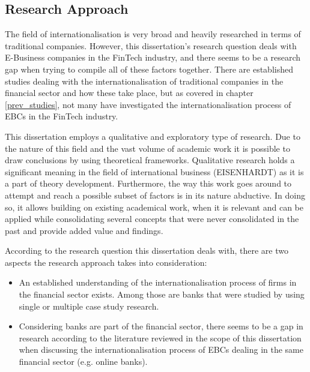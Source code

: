 \documentclass[11pt,a4paper]{article}
\begin{document}
{{\subsection{Research Approach} %
The field of internationalisation is very broad and heavily researched in terms of traditional companies. However, this dissertation's research question deals with E-Business companies in the FinTech industry, and there seems to be a research gap when trying to compile all of these factors together. There are established studies dealing with the internationalisation of traditional companies in the financial sector and how these take place, but as covered in chapter \ref{prev_studies}, not many have investigated the internationalisation process of EBCs in the FinTech industry. \par
This dissertation employs a qualitative and exploratory type of research. Due to the nature of this field and the vast volume of academic work it is possible to draw conclusions by using theoretical frameworks. Qualitative research holds a significant meaning in the field of international business (EISENHARDT) as it is a part of theory development. Furthermore, the way this work goes around to attempt and reach a possible subset of factors is in its nature abductive.  In doing so, it allows building on existing academical work, when it is relevant and can be applied while consolidating several concepts that were never consolidated in the past and provide added value and findings. \par %
According to the research question this dissertation deals with, there are two aspects the research approach takes into consideration:
\begin{itemize}
 \item {An established understanding of the internationalisation process of firms in the financial sector exists. Among those are banks that were studied by using single or multiple case study research.}
 \item{Considering banks are part of the financial sector, there seems to be a gap in research according to the literature reviewed in the scope of this dissertation when discussing the internationalisation process of EBCs dealing in the same financial sector (e.g. online banks). }
\end{itemize}



}}
\end{document}
